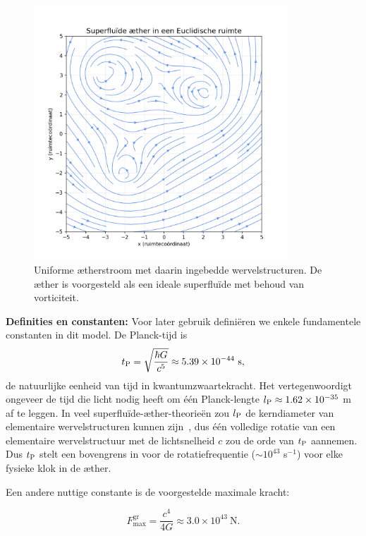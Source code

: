 \begin{figure}[htbp]
    \centering
    \includegraphics[width=0.85\textwidth]{images/04-ÆtherSuperfluïde_nl}
    \caption{Uniforme ætherstroom met daarin ingebedde wervelstructuren. De æther is voorgesteld als een ideale superfluïde met behoud van vorticiteit.}
    \label{fig:ÆtherSuperfluïde}
\end{figure}


\textbf{Definities en constanten:} Voor later gebruik definiëren we enkele fundamentele constanten in dit model. De Planck-tijd is
\[
    t_{\textrm P} = \sqrt{\frac{\hbar G}{c^5}} \approx 5.39\times10^{-44}\ \text{s},
\]
de natuurlijke eenheid van tijd in kwantumzwaartekracht. Het vertegenwoordigt ongeveer de tijd die licht nodig heeft om één Planck-lengte $l_{\textrm P} \approx 1.62\times10^{-35}$ m af te leggen. In veel superfluïde-æther-theorieën zou $l_{\textrm P}$ de kerndiameter van elementaire wervelstructuren kunnen zijn~\cite{Winterberg2002-PlanckÆther}, dus één volledige rotatie van een elementaire wervelstructuur met de lichtsnelheid $c$ zou de orde van $t_{\textrm P}$ aannemen. Dus $t_{\textrm P}$ stelt een bovengrens in voor de rotatiefrequentie ($\sim 10^{43}$ s$^{-1}$) voor elke fysieke klok in de æther.

Een andere nuttige constante is de voorgestelde maximale kracht:

\begin{equation*}
    F^{\text{gr}}_{\text{max}} = \frac{c^4}{4G} \approx 3.0\times10^{43}\ \text{N}.
\end{equation*}

